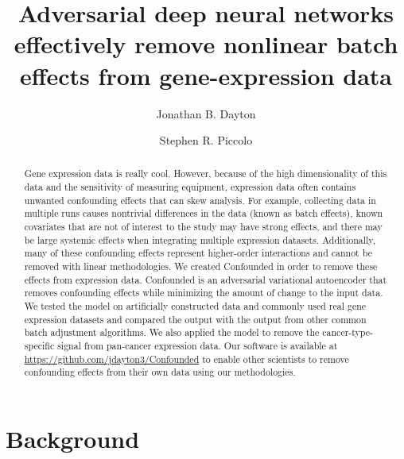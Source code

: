 \documentclass[notitlepage]{article}
\begin{document}
\title{Adversarial deep neural networks effectively remove nonlinear batch effects from gene-expression data}
\author[1]{Jonathan B. Dayton}
\author[1]{Stephen R. Piccolo}
\date{}

\maketitle

\begin{abstract}
	Gene expression data is really cool.
	However, because of the high dimensionality of this data and the sensitivity of measuring equipment, expression data often contains unwanted confounding effects that can skew analysis.
	For example, collecting data in multiple runs causes nontrivial differences in the data (known as batch effects),
	known covariates that are not of interest to the study may have strong effects,
	and there may be large systemic effects when integrating multiple expression datasets.
	Additionally, many of these confounding effects represent higher-order interactions and cannot be removed with linear methodologies.
	We created Confounded in order to remove these effects from expression data.
	Confounded is an adversarial variational autoencoder that removes confounding effects while minimizing the amount of change to the input data.
	We tested the model on artificially constructed data and commonly used real gene expression datasets and compared the output with the output from other common batch adjustment algorithms.
	We also applied the model to remove the cancer-type-specific signal from pan-cancer expression data.
	Our software is available at \url{https://github.com/jdayton3/Confounded} to enable other scientists to remove confounding effects from their own data using our methodologies.
\end{abstract}

\section{Background} \label{sec:background}
\end{document}
